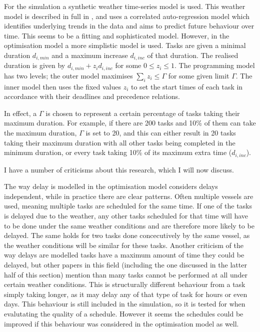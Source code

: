 \documentclass[a4paper,12pt]{article}
\begin{document}
For the simulation a synthetic weather time-series model is used. This weather model is described in full in \cite{dinwoodie2014operational} , and uses a correlated auto-regression model which identifies underlying trends in the data and aims to predict future behaviour over time. This seems to be a fitting and sophisticated model. However, in the optimisation model a more simplistic model is used. Tasks are given a minimal duration $d_{i, min}$ and a maximum increase $d_{i, inc}$ of that duration. The realised duration is given by $d_{i,  min} + z_i d_{i, inc}$ for some $0 \leq z_i \leq 1$. The programming model has two levels; the outer model maximises $\sum_i z_i \leq \Gamma$ for some given limit $\Gamma$. The inner model then uses the fixed values $z_i$ to set the start times of each task in accordance with their deadlines and precedence relations. 

In effect, a $\Gamma$ is chosen to represent a certain percentage of tasks taking their maximum duration. For example, if there are 200 tasks and 10\% of them can take the maximum duration, $\Gamma$ is set to 20, and this can either result in 20 tasks taking their maximum duration with all other tasks being completed in the minimum duration, or every task taking 10\% of its maximum extra time ($d_{i, inc}$). 

\bigskip

I have a number of criticisms about this research, which I will now discuss.

The way delay is modelled in the optimisation model considers delays independent, while in practice there are clear patterns. Often multiple vessels are used, meaning multiple tasks are scheduled for the same time. If one of the tasks is delayed due to the weather, any other tasks scheduled for that time will have to be done under the same weather conditions and are therefore more likely to be delayed. The same holds for two tasks done concecutively by the same vessel, as the weather conditions will be similar for these tasks. 
Another criticism of the way delays are modelled tasks have a maximum amount of time they could be delayed, but other papers in this field (including the one discussed in the latter half of this section) mention than many tasks cannot be performed at all under certain weather conditions. This is structurally different behaviour from a task simply taking longer, as it may delay any of that type of task for hours or even days. This behaviour is still included in the simulation, so it is tested for when evalutating the quality of a schedule. However it seems the schedules could be improved if this behaviour was considered in the optimisation model as well. 
\end{document}
